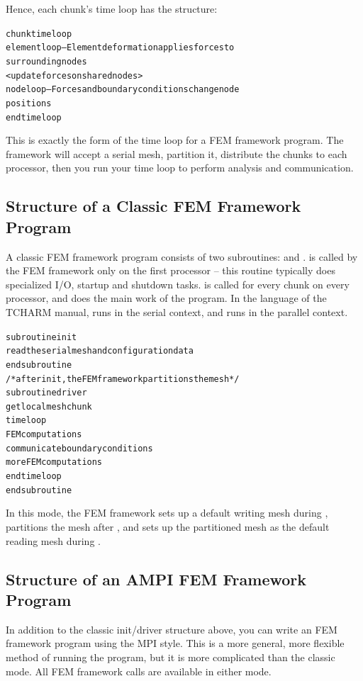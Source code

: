 \documentclass[10pt]{article}
\begin{document}
Hence, each chunk's time loop has the structure:

\begin{alltt}
     chunk time loop
          element loop-- Element deformation applies forces to
          surrounding nodes
          <update forces on shared nodes>
          node loop-- Forces and boundary conditions change node
          positions
     end time loop
\end{alltt}

This is exactly the form of the time loop for a \charmpp{} FEM framework
program.  The framework will accept a serial mesh, partition it, distribute
the chunks to each processor, then you run your time loop to perform
analysis and communication.


\subsection{Structure of a Classic FEM Framework Program}

A classic FEM framework program consists of two subroutines: 
 and .
 is called by the FEM framework
only on the first processor -- this routine typically does specialized I/O,
startup and shutdown tasks.   is called for every chunk on every
processor, and does the main work of the program.  In the language of the
TCHARM manual,  runs in the serial context, 
and  runs in the parallel context.

\begin{alltt}
     subroutine init
          read the serial mesh and configuration data
     end subroutine
/* after init, the FEM framework partitions the mesh */
     subroutine driver
          get local mesh chunk
          time loop
               FEM computations
               communicate boundary conditions
               more FEM computations
          end time loop
     end subroutine
\end{alltt}

In this mode, the FEM framework sets up a default writing
mesh during , partitions the mesh after ,
and sets up the partitioned mesh as the default reading mesh 
during . 


\subsection{Structure of an AMPI FEM Framework Program}

In addition to the classic init/driver structure above,
you can write an FEM framework program using the MPI style.
This is a more general, more flexible method of running
the program, but it is more complicated than the classic mode.
All FEM framework calls are available in either mode.
\end{document}
